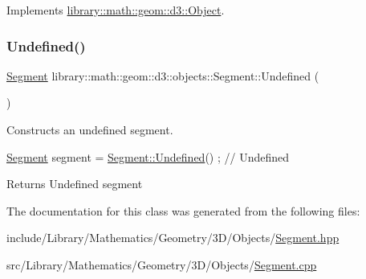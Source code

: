 Implements \hyperlink{classlibrary_1_1math_1_1geom_1_1d3_1_1_object_aa166f4ce4d116a248f0fc861c75012ca}{library\+::math\+::geom\+::d3\+::\+Object}.

\mbox{\label{classlibrary_1_1math_1_1geom_1_1d3_1_1objects_1_1_segment_a3b2505e9553ba0067f8184120c106602}} 
\subsubsection{\texorpdfstring{Undefined()}{Undefined()}}
{\footnotesize\ttfamily \hyperlink{classlibrary_1_1math_1_1geom_1_1d3_1_1objects_1_1_segment}{Segment} library\+::math\+::geom\+::d3\+::objects\+::\+Segment\+::\+Undefined (\begin{DoxyParamCaption}{ }\end{DoxyParamCaption})\hspace{0.3cm}{\ttfamily [static]}}



Constructs an undefined segment. 


\begin{DoxyCode}
\hyperlink{classlibrary_1_1math_1_1geom_1_1d3_1_1objects_1_1_segment_a5562342d1edf2f52e37ce1bc138ee7d7}{Segment} segment = \hyperlink{classlibrary_1_1math_1_1geom_1_1d3_1_1objects_1_1_segment_a3b2505e9553ba0067f8184120c106602}{Segment::Undefined}() ; \textcolor{comment}{// Undefined}
\end{DoxyCode}


\begin{DoxyReturn}{Returns}
Undefined segment 
\end{DoxyReturn}


The documentation for this class was generated from the following files\+:\begin{DoxyCompactItemize}
\item 
include/\+Library/\+Mathematics/\+Geometry/3\+D/\+Objects/\hyperlink{3_d_2_objects_2_segment_8hpp}{Segment.\+hpp}\item 
src/\+Library/\+Mathematics/\+Geometry/3\+D/\+Objects/\hyperlink{3_d_2_objects_2_segment_8cpp}{Segment.\+cpp}\end{DoxyCompactItemize}
